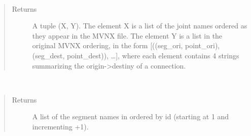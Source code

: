 \documentclass[letterpaper,10pt,english,openany,oneside]{sphinxmanual}
\begin{document}
\begin{fulllineitems}
\begin{fulllineitems}
\end{fulllineitems}


\begin{fulllineitems}
\label{\detokenize{io_anim_mvnx:io_anim_mvnx.mvnx.Mvnx.extract_joints}}~\begin{quote}\begin{description}
\item[{Returns}] \leavevmode
A tuple (X, Y). The element X is a list of the joint names
ordered as they appear in the MVNX file.
The element Y is a list in the original MVNX ordering, in the form
{[}((seg\_ori, point\_ori), (seg\_dest, point\_dest)), …{]}, where each
element contains 4 strings summarizing the origin-\textgreater{}destiny of a
connection.

\end{description}\end{quote}

\end{fulllineitems}


\begin{fulllineitems}
\label{\detokenize{io_anim_mvnx:io_anim_mvnx.mvnx.Mvnx.extract_segments}}~\begin{quote}\begin{description}
\item[{Returns}] \leavevmode
A list of the segment names in 
ordered by id (starting at 1 and incrementing +1).

\end{description}\end{quote}

\end{fulllineitems}


\end{fulllineitems}

\end{document}
